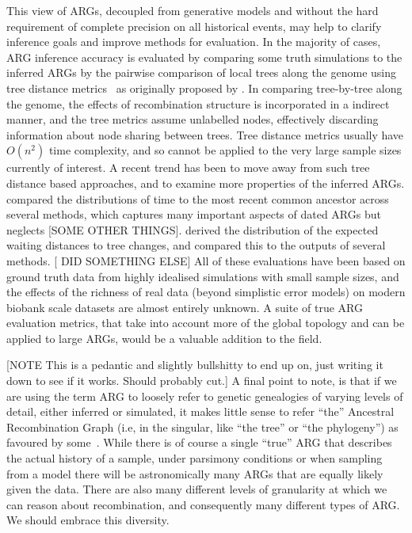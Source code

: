 \documentclass{article}
\begin{document}
This view of ARGs,
decoupled from generative models and
without the hard requirement
of complete precision on all historical events, may help
to clarify inference goals and improve
methods for evaluation.
In the majority of cases,
ARG inference accuracy is evaluated by comparing some truth simulations
to the inferred ARGs by the pairwise comparison of local trees along the genome
using tree distance
metrics~\citep[e.g.][]{robinson1981comparison,kendall2016mapping}
as originally proposed by \citet{kuhner2015assessing}.
In comparing tree-by-tree along the genome, the effects of recombination
structure is incorporated in a indirect manner, and the tree
metrics assume unlabelled nodes, effectively discarding information
about node sharing between trees.
Tree distance metrics usually have $O(n^2)$ time complexity, and so cannot be
applied to the very large sample sizes currently of interest.
A recent trend has been to move away from such tree distance
based approaches, and to examine more properties of the inferred ARGs.
\citet{brandt2021evaluation} compared the
distributions of time to the most recent common ancestor across several
methods, which captures many important aspects of dated ARGs
but neglects [SOME OTHER THINGS].
\citet{deng2021distribution} derived the distribution of the expected
waiting distances to tree changes, and compared this to the
outputs of several methods.
[ \citet{ignatieva2023distribution} DID SOMETHING ELSE]
All of these evaluations have been based on
ground truth data from highly idealised simulations
with small sample sizes,
and the effects of the richness of real data
(beyond simplistic error models)
on modern biobank scale datasets
are almost entirely unknown.
A suite of true ARG evaluation metrics, that take into account more of the
global topology and can be applied to large ARGs, would be a
valuable addition to the field.

[NOTE This is a pedantic and slightly bullshitty to end up on,
just writing it down to see if it works. Should probably cut.]
A final point to note, is that
if we are using the term ARG
to loosely refer to genetic genealogies of varying
levels of detail, either inferred or simulated,
it makes little sense to refer ``the'' Ancestral Recombination
Graph (i.e, in  the singular, like ``the tree'' or
``the phylogeny'')
as favoured by some~\citep[e.g.][]{
arenas2013importance,palamara2016argon,hubisz2020inference}.
While there is of course a single ``true'' ARG that describes
the actual history of a sample,
under parsimony conditions or when sampling from a model there
will be astronomically
many ARGs that are equally likely given the data.
There are also many different levels of granularity at which we
can reason about recombination,
and consequently many different types of ARG.
We should embrace this diversity.
\end{document}
